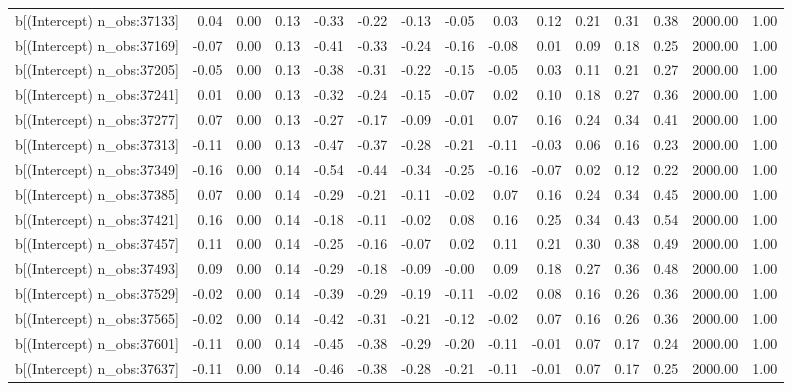 \begin{table}[ht]
\begin{tabular}{rrrrrrrrrrrrrrr}
  b[(Intercept) n\_obs:37133] & 0.04 & 0.00 & 0.13 & -0.33 & -0.22 & -0.13 & -0.05 & 0.03 & 0.12 & 0.21 & 0.31 & 0.38 & 2000.00 & 1.00 \\ 
  b[(Intercept) n\_obs:37169] & -0.07 & 0.00 & 0.13 & -0.41 & -0.33 & -0.24 & -0.16 & -0.08 & 0.01 & 0.09 & 0.18 & 0.25 & 2000.00 & 1.00 \\ 
  b[(Intercept) n\_obs:37205] & -0.05 & 0.00 & 0.13 & -0.38 & -0.31 & -0.22 & -0.15 & -0.05 & 0.03 & 0.11 & 0.21 & 0.27 & 2000.00 & 1.00 \\ 
  b[(Intercept) n\_obs:37241] & 0.01 & 0.00 & 0.13 & -0.32 & -0.24 & -0.15 & -0.07 & 0.02 & 0.10 & 0.18 & 0.27 & 0.36 & 2000.00 & 1.00 \\ 
  b[(Intercept) n\_obs:37277] & 0.07 & 0.00 & 0.13 & -0.27 & -0.17 & -0.09 & -0.01 & 0.07 & 0.16 & 0.24 & 0.34 & 0.41 & 2000.00 & 1.00 \\ 
  b[(Intercept) n\_obs:37313] & -0.11 & 0.00 & 0.13 & -0.47 & -0.37 & -0.28 & -0.21 & -0.11 & -0.03 & 0.06 & 0.16 & 0.23 & 2000.00 & 1.00 \\ 
  b[(Intercept) n\_obs:37349] & -0.16 & 0.00 & 0.14 & -0.54 & -0.44 & -0.34 & -0.25 & -0.16 & -0.07 & 0.02 & 0.12 & 0.22 & 2000.00 & 1.00 \\ 
  b[(Intercept) n\_obs:37385] & 0.07 & 0.00 & 0.14 & -0.29 & -0.21 & -0.11 & -0.02 & 0.07 & 0.16 & 0.24 & 0.34 & 0.45 & 2000.00 & 1.00 \\ 
  b[(Intercept) n\_obs:37421] & 0.16 & 0.00 & 0.14 & -0.18 & -0.11 & -0.02 & 0.08 & 0.16 & 0.25 & 0.34 & 0.43 & 0.54 & 2000.00 & 1.00 \\ 
  b[(Intercept) n\_obs:37457] & 0.11 & 0.00 & 0.14 & -0.25 & -0.16 & -0.07 & 0.02 & 0.11 & 0.21 & 0.30 & 0.38 & 0.49 & 2000.00 & 1.00 \\ 
  b[(Intercept) n\_obs:37493] & 0.09 & 0.00 & 0.14 & -0.29 & -0.18 & -0.09 & -0.00 & 0.09 & 0.18 & 0.27 & 0.36 & 0.48 & 2000.00 & 1.00 \\ 
  b[(Intercept) n\_obs:37529] & -0.02 & 0.00 & 0.14 & -0.39 & -0.29 & -0.19 & -0.11 & -0.02 & 0.08 & 0.16 & 0.26 & 0.36 & 2000.00 & 1.00 \\ 
  b[(Intercept) n\_obs:37565] & -0.02 & 0.00 & 0.14 & -0.42 & -0.31 & -0.21 & -0.12 & -0.02 & 0.07 & 0.16 & 0.26 & 0.36 & 2000.00 & 1.00 \\ 
  b[(Intercept) n\_obs:37601] & -0.11 & 0.00 & 0.14 & -0.45 & -0.38 & -0.29 & -0.20 & -0.11 & -0.01 & 0.07 & 0.17 & 0.24 & 2000.00 & 1.00 \\ 
  b[(Intercept) n\_obs:37637] & -0.11 & 0.00 & 0.14 & -0.46 & -0.38 & -0.28 & -0.21 & -0.11 & -0.01 & 0.07 & 0.17 & 0.25 & 2000.00 & 1.00 \\ 

\end{tabular}
\end{table}
